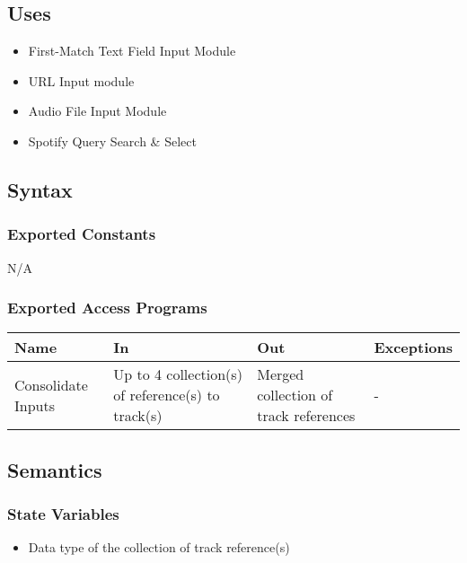 \documentclass[12pt, titlepage]{article}
\begin{document}
\subsection{Uses}
\begin{itemize}
  \item First-Match Text Field Input Module
  \item URL Input module
  \item Audio File Input Module
  \item Spotify Query Search \& Select
\end{itemize}

\subsection{Syntax}

\subsubsection{Exported Constants}
N/A

\subsubsection{Exported Access Programs}

\begin{center}
\begin{tabular}{p{2cm} p{4cm} p{4cm} p{2cm}}
\hline
\textbf{Name} & \textbf{In} & \textbf{Out} & \textbf{Exceptions}\\
\hline%
Consolidate Inputs &Up to 4 collection(s) of reference(s) to track(s) &Merged collection of track references &-\\

\hline
\end{tabular}
\end{center}

\subsection{Semantics}

\subsubsection{State Variables}
\begin{itemize}
  \item Data type of the collection of track reference(s)
\end{itemize}
\end{document}
